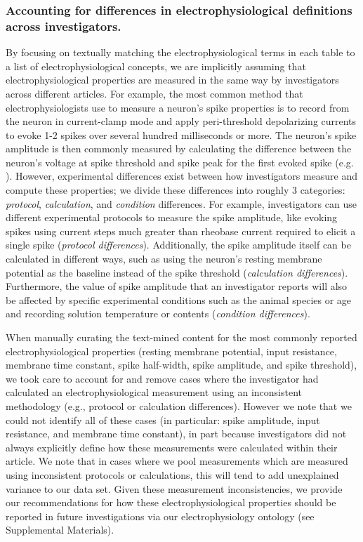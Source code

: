 \documentclass{template/frontiersSCNS} %
\begin{document}
\subsubsection{Accounting for differences in electrophysiological definitions across investigators.}
By focusing on textually matching the electrophysiological terms in each table to a list of electrophysiological concepts, we are implicitly assuming that electrophysiological properties are measured in the same way by investigators across different articles.  
For example, the most common method that electrophysiologists use to measure a neuron's spike properties is to record from the neuron in current-clamp mode and apply peri-threshold depolarizing currents to evoke 1-2 spikes over several hundred milliseconds or more.  
The neuron's spike amplitude is then commonly measured by calculating the difference between the neuron's voltage at spike threshold and spike peak for the first evoked spike (e.g. \citep{connors_electrophysiological_1982,toledo-rodriguez_correlation_2004}).  
However, experimental differences exist between how investigators measure and compute these properties; 
we divide these differences into roughly 3 categories: \textit{protocol}, \textit{calculation}, and \textit{condition} differences.  
For example, investigators can use different experimental protocols to measure the spike amplitude, like evoking spikes using current steps much greater than rheobase current required to elicit a single spike (\textit{protocol differences}).  
Additionally, the spike amplitude itself can be calculated in different ways, such as using the neuron's resting membrane potential as the baseline instead of the spike threshold (\textit{calculation differences}).  
Furthermore, the value of spike amplitude that an investigator reports will also be affected by specific experimental conditions such as the animal species or age and recording solution temperature or contents (\textit{condition differences}).

When manually curating the text-mined content for the most commonly reported electrophysiological properties (resting membrane potential, input resistance, membrane time constant, spike half-width, spike amplitude, and spike threshold), we took care to account for and remove cases where the investigator had calculated an electrophysiological measurement using an inconsistent methodology (e.g., protocol or calculation differences).  
However we note that we could not identify all of these cases (in particular: spike amplitude, input resistance, and membrane time constant), in part because investigators did not always explicitly define how these measurements were calculated within their article.  
We note that in cases where we pool measurements which are measured using inconsistent protocols or calculations, this will tend to add unexplained variance to our data set.  
Given these measurement inconsistencies, we provide our recommendations for how these electrophysiological properties should be reported in future investigations via our electrophysiology ontology (see Supplemental Materials).  
\end{document}
